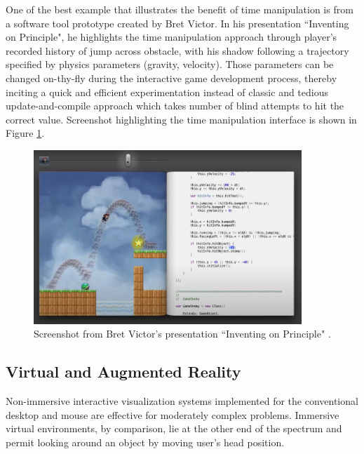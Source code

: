 One of the best example that illustrates the benefit of time manipulation is from a software tool prototype created by Bret Victor. In his presentation ``Inventing on Principle", he highlights the time manipulation approach through player's recorded history of jump across obstacle, with his shadow following a trajectory specified by physics parameters (gravity, velocity). Those parameters can be changed on-thy-fly during the interactive game development process, thereby inciting a quick and efficient experimentation instead of classic and tedious update-and-compile approach which takes number of blind attempts to hit the correct value. Screenshot highlighting the time manipulation interface is shown in Figure \ref{fig:victor-time-manip}.

\begin{figure}[!ht]
	\centering
	\includegraphics[width=0.9\textwidth]{figures/victor-time-manip.jpg}
	\caption{Screenshot from Bret Victor's presentation ``Inventing on Principle" \citep{victorInventingOnPrinciple2018}.}
	\label{fig:victor-time-manip}
\end{figure}

\subsection{Virtual and Augmented Reality}\label{sec:vrar}

Non-immersive interactive visualization systems implemented for the conventional desktop and mouse are effective for moderately complex problems. Immersive virtual environments, by comparison, lie at the other end of the spectrum and permit looking around an object by moving user's head position.

